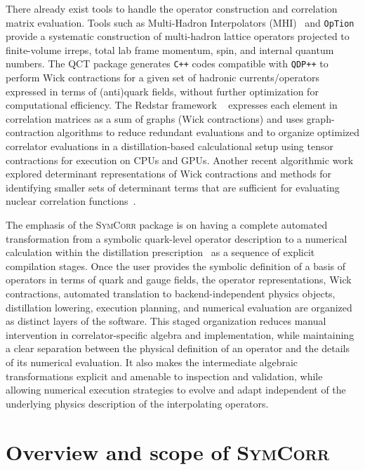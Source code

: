 \documentclass[a4paper,fleqn]{cas-dc}
\begin{document}
There already exist tools to handle the operator construction and correlation matrix evaluation. Tools such as Multi-Hadron Interpolators (MHI)~\cite{PhysRevD.109.094516} and \texttt{OpTion}~\cite{Yan:2025op} provide a systematic construction of multi-hadron lattice operators projected to finite-volume irreps, total lab frame momentum, spin, and internal quantum numbers. The QCT package \cite{Djukanovic:2016spv} generates \texttt{C++} codes compatible with \texttt{QDP++} \cite{Edwards:2004sx} to perform Wick contractions for a given set of hadronic currents/operators expressed in terms of (anti)quark fields, without further optimization for computational efficiency. The Redstar framework ~\cite{10.1145/3592979.3593409} expresses each element in correlation matrices as a sum of graphs (Wick contractions) and uses graph-contraction algorithms to reduce redundant evaluations and to organize optimized correlator evaluations in a distillation-based calculational setup \cite{Peardon:2009gh} using tensor contractions for execution on CPUs and GPUs. Another recent algorithmic work explored determinant representations of Wick contractions and methods for identifying smaller sets of determinant terms that are sufficient for evaluating nuclear correlation functions~\cite{PhysRevD.110.114505}.

The emphasis of the \textsc{SymCorr} package is on having a complete automated transformation from a symbolic quark-level operator description to a numerical calculation within the distillation prescription~\cite{Peardon:2009gh} as a sequence of explicit compilation stages. Once the user provides the symbolic definition of a basis of operators in terms of quark and gauge fields, the operator representations, Wick contractions, automated translation to backend-independent physics objects, distillation lowering, execution planning, and numerical evaluation are organized as distinct layers of the software. This staged organization reduces manual intervention in correlator-specific algebra and implementation, while maintaining a clear separation between the physical definition of an operator and the details of its numerical evaluation. It also makes the intermediate algebraic transformations explicit and amenable to inspection and validation, while allowing numerical execution strategies to evolve and adapt independent of the underlying physics description of the interpolating operators.

\section{Overview and scope of \textsc{SymCorr}}
\label{sec:background}
\end{document}
